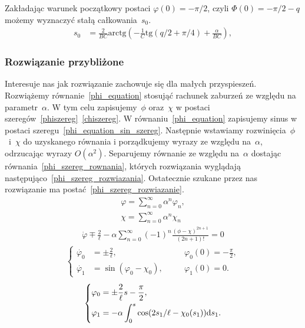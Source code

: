 Zakładając warunek początkowy postaci $\varphi(0) = -\pi/2$, 
czyli $\Phi(0) = -\pi/2 - q$ możemy wyznaczyć stałą całkowania~$s_0$.
\begin{align*}
s_0 & = \frac{2}{BC} \text{arctg}  
\left( - \frac{1}{C}\text{tg} (q/2 + \pi/4) +\frac{\alpha}{BC} \right),
\end{align*}

\newpage
\subsubsection{Rozwiązanie przybliżone}
Interesuje nas jak rozwiązanie zachowuje się dla małych przyspieszeń. 
Rozwiążemy równanie~\eqref{phi_equation} stosująć 
rachunek zaburzeń ze względu na 
parametr~$\alpha$. W tym celu zapisujemy~$\phi$ oraz~$\chi$ w postaci
szeregów~\eqref{phiszereg}~\eqref{chiszereg}. 
W równaniu~\eqref{phi_equation} zapisujemy sinus w postaci 
szeregu~\eqref{phi_equation_sin_szereg}. Następnie wstawiamy 
rozwinięcia~$\phi$~i~$\chi$ do uzyskanego równania i porządkujemy wyrazy
ze względu na~$\alpha$, odrzucając wyrazy $O(\alpha^2)$. 
Separujemy równanie ze względu na~$\alpha$ dostając 
równania~\eqref{phi_szereg_rownania}, 
których rozwiązania wyglądają 
następująco~\eqref{phi_szereg_rozwiazania}.
Ostatecznie szukane przez nas rozwiązanie ma 
postać~\eqref{phi_szereg_rozwiazanie}.
\begin{align}\label{phiszereg}
\varphi = \sum_{n=0}^{\infty} \alpha^n \varphi_n, \\
\chi = \sum_{n=0}^{\infty} \alpha^n \chi_n  \label{chiszereg}
\end{align}
\begin{align}\label{phi_equation_sin_szereg}
\dot{\varphi} \mp \frac{2}{\ell} - \alpha
\sum_{n=0}^{\infty} (-1)^n \frac{(\phi-\chi)^{2n+1}}{(2n+1)!} =0
\end{align}
\begin{align}\label{phi_szereg_rownania}
\left\{ 
\begin{aligned}
\dot{\varphi_0} & = \pm \frac{2}{\ell} , &\quad & 
\varphi_0(0)=-\frac{\pi}{2},\\
\dot{\varphi_1} & = \sin (\varphi_0 - \chi_0  ), &\quad & 
\varphi_1(0) = 0 .
\end{aligned}
\right.
\end{align}
\begin{align}\label{phi_szereg_rozwiazania}
\left\{ 
\begin{aligned}
\varphi_0 & =  \pm \frac{2}{\ell}s - \frac{\pi}{2},\\
\varphi_1 & =  -\alpha \int_0^s \cos 
(2 s_1 / \ell  - \chi_0(s_1)  ) \text{d} s_1 .
\end{aligned}
\right.
\end{align}
